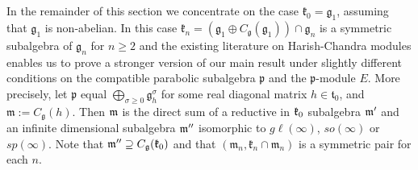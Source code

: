 \documentclass[12pt]{article}
\newcommand{\kk}{\mathfrak{k}}
\newcommand{\mm}{\mathfrak{m}}
\newcommand{\pp}{\mathfrak{p}}
\renewcommand{\gg}{\mathfrak{g}}
\renewcommand{\sp}{{sp}}
\newcommand{\gl}{{g\ell}}
\newcommand{\so}{{so}}
\begin{document}










In the remainder of this section we concentrate on the case $\kk_0=\gg_1$, assuming that $\gg_1$ is non-abelian. In this case $\kk_n=(\gg_1\oplus C_\gg(\gg_1))\cap\gg_n$ is a symmetric subalgebra of $\gg_n$ for $n\geq 2$ and the existing literature on Harish-Chandra modules enables us to prove a stronger version of our main result under slightly different conditions on the compatible parabolic subalgebra $\pp$ and the $\pp$-module $E$. More precisely, let $\pp$ equal $\bigoplus\limits_{\sigma\geq 0}\gg_h^\sigma$ for some real diagonal matrix $h\in\mathfrak t_0$, and $\mm:=C_\gg(h)$. Then $\frak m$ is the direct sum of a reductive in $\frak k_0$ subalgebra $\frak m'$ and an infinite dimensional subalgebra $\frak m''$ isomorphic to $\gl(\infty)$, $\so(\infty)$ or $\sp(\infty)$. Note that ${\frak m}'' \supseteq C_{\frak g} (\frak k_0)$ and that $(\mm_n,\kk_n\cap\mm_n)$ is a symmetric pair for each $n$.
\end{document}
